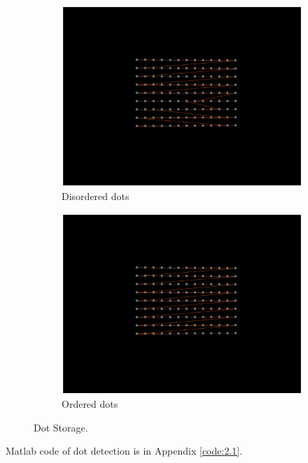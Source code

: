 \begin{figure}[h!]
	\centering
	\begin{subfigure}[t]{0.48\linewidth}
		\centering
		\includegraphics[width=1\linewidth]{figures/part2/dot_disorder.eps}
		\caption{Disordered dots}
		\label{fig:dot_disorder}
	\end{subfigure}
	\begin{subfigure}[t]{0.48\linewidth}
		\centering
		\includegraphics[width=1\linewidth]{figures/part2/dot_ordered.eps}
		\caption{Ordered dots}
		\label{fig:dot_ordered}
	\end{subfigure}
	\caption{Dot Storage.}
\end{figure}

Matlab code of dot detection is in Appendix \ref{code:2.1}.

